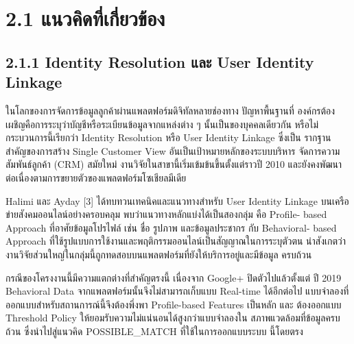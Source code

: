 \documentclass[12pt,a4paper]{report}
\begin{document}
\section*{2.1 แนวคิดที่เกี่ยวข้อง}
\subsection*{2.1.1 Identity Resolution และ User Identity Linkage}
ในโลกของการจัดการข้อมูลลูกค้าผ่านแพลตฟอร์มดิจิทัลหลายช่องทาง ปัญหาพื้นฐานที่ องค์กรต้องเผชิญคือการระบุว่าบัญชีหรือระเบียนข้อมูลจากแหล่งต่าง ๆ นั้นเป็นของบุคคลเดียวกัน หรือไม่ กระบวนการนี้เรียกว่า Identity Resolution หรือ User Identity Linkage ซึ่งเป็น รากฐานสำคัญของการสร้าง Single Customer View อันเป็นเป้าหมายหลักของระบบบริหาร จัดการความสัมพันธ์ลูกค้า (CRM) สมัยใหม่ งานวิจัยในสาขานี้เริ่มเข้มข้นขึ้นตั้งแต่ราวปี 2010 และยังคงพัฒนาต่อเนื่องตามการขยายตัวของแพลตฟอร์มโซเชียลมีเดีย\par
Halimi และ Ayday [3] ได้ทบทวนเทคนิคและแนวทางสำหรับ User Identity Linkage บนเครือข่ายสังคมออนไลน์อย่างครอบคลุม พบว่าแนวทางหลักแบ่งได้เป็นสองกลุ่ม คือ Profile- based Approach ที่อาศัยข้อมูลโปรไฟล์ เช่น ชื่อ รูปภาพ และข้อมูลประชากร กับ Behavioral- based Approach ที่ใช้รูปแบบการใช้งานและพฤติกรรมออนไลน์เป็นสัญญาณในการระบุตัวตน น่าสังเกตว่างานวิจัยส่วนใหญ่ในกลุ่มนี้ถูกทดสอบบนแพลตฟอร์มที่ยังให้บริการอยู่และมีข้อมูล ครบถ้วน\par
กรณีของโครงงานนี้มีความแตกต่างที่สำคัญตรงนี้ เนื่องจาก Google+ ปิดตัวไปแล้วตั้งแต่ ปี 2019 Behavioral Data จากแพลตฟอร์มนั้นจึงไม่สามารถเก็บแบบ Real-time ได้อีกต่อไป แบบจำลองที่ออกแบบสำหรับสถานการณ์นี้จึงต้องพึ่งพา Profile-based Features เป็นหลัก และ ต้องออกแบบ Threshold Policy ให้ยอมรับความไม่แน่นอนได้สูงกว่าแบบจำลองใน สภาพแวดล้อมที่ข้อมูลครบถ้วน ซึ่งนำไปสู่แนวคิด POSSIBLE\_MATCH ที่ใช้ในการออกแบบระบบ นี้โดยตรง\par
\end{document}
